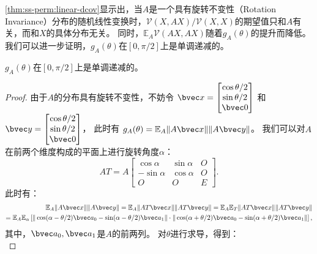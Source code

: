 \autoref{thm:ss-perm:linear-dcov}显示出，当$A$是一个具有旋转不变性（Rotation Invariance）分布的随机线性变换时，$\mathcal{V}(X, AX)/\mathcal{V}(X, X)$的期望值只和$A$有关，而和$X$的具体分布无关。
%
同时，$\mathbb E_A \mathcal{V}(AX, AX)$随着$g_A(\theta)$的提升而降低。
%
我们可以进一步证明，$g_A(\theta)$在$[0, \pi/2]$上是单调递减的。
%
\begin{proposition}
    $g_A(\theta)$在$[0, \pi/2]$上是单调递减的。
\end{proposition}
%
\begin{proof}
    由于$A$的分布具有旋转不变性，不妨令
    $\bvec x = \begin{bmatrix}
        \cos \theta/2 \\ \sin \theta/2 \\ \bvec 0   
    \end{bmatrix}$
    和
    $\bvec y = \begin{bmatrix}
        \cos \theta/2 \\ \sin \theta/2 \\ \bvec 0
    \end{bmatrix}$，
    此时有 $g_A(\theta) = \mathbb E_A \Vert A\bvec x\Vert \Vert A \bvec y\Vert$。
    我们可以对$A$在前两个维度构成的平面上进行旋转角度$\alpha$：
    \begin{equation}
        AT = A \begin{bmatrix}
            \cos \alpha & \sin \alpha & O \\
            -\sin \alpha &\cos \alpha & O \\
            O & O & E
        \end{bmatrix}.
    \end{equation}
    此时有：
    \begin{equation}
    \begin{split}
        \mathbb E_A \Vert A\bvec x \Vert \Vert A \bvec y \Vert = \mathbb E_A \Vert AT \bvec x \Vert \Vert AT \bvec y \Vert = \mathbb E_A \mathbb E_T \Vert AT \bvec x \Vert \Vert AT \bvec y \Vert \\
        = \mathbb E_A \mathbb E_\alpha 
        \left[
        \Vert \cos(\alpha - \theta/2)\bvec a_0 - \sin (\alpha - \theta/2) \bvec a_1\Vert 
        \cdot
        \Vert \cos(\alpha + \theta/2)\bvec a_0 - \sin (\alpha + \theta/2) \bvec a_1\Vert
        \right],
    \end{split}   
    \end{equation}
    其中，$\bvec a_0, \bvec a_1$是$A$的前两列。
    对$\theta$进行求导，得到：
    \begin{equation}

\end{equation}
\end{proof}
